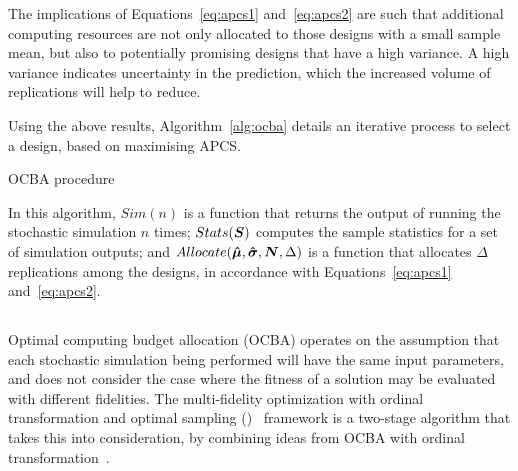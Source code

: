 The implications of Equations~\ref{eq:apcs1} and~\ref{eq:apcs2} are such that additional computing resources are not only allocated to those designs with a small sample mean, but also to potentially promising designs that have a high variance. A high variance indicates uncertainty in the prediction, which the increased volume of replications will help to reduce.

Using the above results, Algorithm~\ref{alg:ocba} details an iterative process to select a design, based on maximising APCS.

\begin{algorithm}[h!] 
\caption{OCBA procedure}
\label{alg:ocba}
{\footnotesize
\begin{algorithmic}[1]
 
 
 
\label{while-loop}
   
   
   
   
   
\ENDWHILE
\end{algorithmic}
}
\end{algorithm}

In this algorithm, $Sim(n)$ is a function that returns the output of running the stochastic simulation $n$ times; $Stats(\boldsymbol{S})$ computes the sample statistics for a set of simulation outputs; and $Allocate(\boldsymbol{\hat{\mu}},\boldsymbol{\hat{\sigma}},\boldsymbol{N},\Delta)$ is a function that allocates $\Delta$ replications among the designs, in accordance with Equations~\ref{eq:apcs1} and~\ref{eq:apcs2}.

\subsection{\motos{}}
Optimal computing budget allocation (OCBA) operates on the assumption that each stochastic simulation being performed will have the same input parameters, and does not consider the case where the fitness of a solution may be evaluated with different fidelities. The multi-fidelity optimization with ordinal transformation and optimal sampling (\motos{})~\cite{xu2016mo2tos} framework is a two-stage algorithm that takes this into consideration, by combining ideas from OCBA with ordinal transformation~\cite{xu2014ordinal}.

